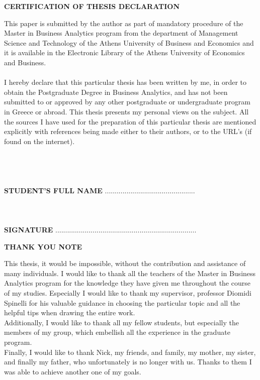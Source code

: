 \documentclass{article}
\begin{document}
\newpage
\begin{center}
\textbf{CERTIFICATION OF THESIS DECLARATION}
\end{center}
This paper is submitted by the author as part of mandatory procedure of the Master in Business Analytics program from the department of Management Science and Technology of the Athens University of Business and Economics and it is available in the Electronic Library of the Athens University of Economics and Business.\\\\
I  hereby  declare  that  this  particular  thesis  
has  been  written  by  me,  in  order  to  obtain  the  
Postgraduate Degree in Business Analytics, and has not been submitted to or approved by any other postgraduate or undergraduate program in Greece or abroad. This thesis presents my personal views  on  the  subject.  All  the  sources  I  have  used  for  the  preparation  of  this  particular  thesis  are mentioned  explicitly  with  references  being  made  either  to  their  authors,  or  to  the  URL’s  (if  found on the internet).\\\\\\\\\\
\textbf{STUDENT'S FULL NAME}
..............................................\\\\\\\\
\textbf{SIGNATURE}
........................................................................\\
\newpage
\begin{center}
\textbf{THANK YOU NOTE}
\end{center}
This thesis, it would be impossible, without the contribution and assistance of many individuals. I would like to thank all the teachers of the Master in Business Analytics program for the knowledge they have given me throughout the course of my studies. Especially I would like to thank my supervisor, professor Diomidi Spinelli for his valuable guidance in choosing the particular topic and all the helpful tips when drawing the entire work.\\
Additionally, I would like to thank all my fellow students, but especially the members of my group, which embellish all the experience in the graduate program. \\
Finally, I would like to thank Nick, my friends, and family, my mother, my sister, and finally my father, who unfortunately is no longer with us. Thanks to them I was able to achieve another one of my goals.
\end{document}
